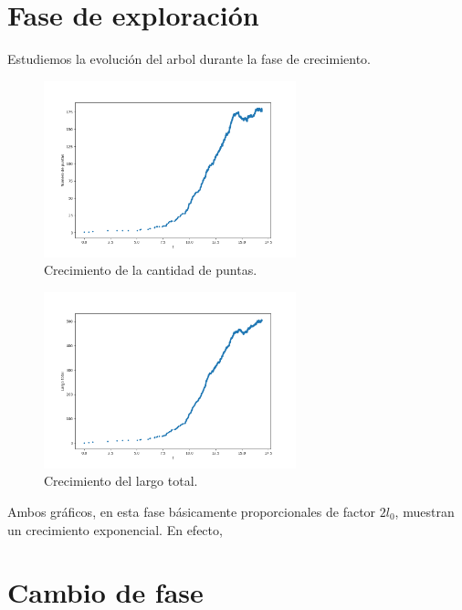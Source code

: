 \documentclass{article}
\begin{document}
\section{Fase de exploración}

Estudiemos la evolución del arbol durante la fase de crecimiento.

\begin{figure}[h!]
    \centering
    \includegraphics[width=0.65\textwidth]{graficos_inst/N_vs_tiempo_principio.png}
    \caption{Crecimiento de la cantidad de puntas.}
    \label{fig:evolucion_N_principio}
\end{figure}

\begin{figure}[h!]
    \centering
    \includegraphics[width=0.65\textwidth]{graficos_inst/largo_vs_tiempo_principio.png}
    \caption{Crecimiento del largo total.}
    \label{fig:evolucion_l_principio}
\end{figure}

Ambos gráficos, en esta fase básicamente proporcionales de factor $2l_0$, muestran un crecimiento exponencial.
En efecto, 

\section{Cambio de fase}
\end{document}
